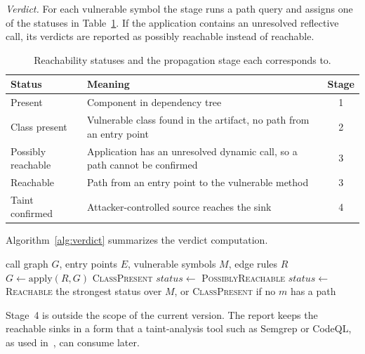 \documentclass[conference]{IEEEtran}
\begin{document}
\emph{Verdict.} For each vulnerable symbol the stage runs a path query and assigns one of the statuses in Table~\ref{tab:status}. If the application contains an unresolved reflective call, its verdicts are reported as possibly reachable instead of reachable.

\begin{table}[t]
\caption{Reachability statuses and the propagation stage each corresponds to.}
\label{tab:status}
\centering
\footnotesize
\renewcommand{\arraystretch}{1.15}
\setlength{\tabcolsep}{2.5pt}
\begin{tabular}{@{}p{0.95in}p{1.95in}c@{}}
\toprule
Status & Meaning & Stage \\
\midrule
Present & Component in dependency tree & 1 \\
Class present & Vulnerable class found in the artifact, no path from an entry point & 2 \\
Possibly reachable & Application has an unresolved dynamic call, so a path cannot be confirmed & 3 \\
Reachable & Path from an entry point to the vulnerable method & 3 \\
Taint confirmed & Attacker-controlled source reaches the sink & 4 \\
\bottomrule
\end{tabular}
\end{table}

Algorithm~\ref{alg:verdict} summarizes the verdict computation.

\begin{algorithm}[t]
\caption{Reachability verdict for one advisory}
\label{alg:verdict}
\small
\begin{algorithmic}[1]
\REQUIRE call graph $G$, entry points $E$, vulnerable symbols $M$, edge rules $R$
\STATE $G \leftarrow \mathrm{apply}(R, G)$
  \RETURN \textsc{ClassPresent}
\ENDIF
{}
      \STATE $status \leftarrow$ \textsc{PossiblyReachable}
    \ELSE
      \STATE $status \leftarrow$ \textsc{Reachable}
    \ENDIF
  \ENDIF
\ENDFOR
\RETURN the strongest status over $M$, or \textsc{ClassPresent} if no $m$ has a path
\end{algorithmic}
\end{algorithm}

Stage~4 is outside the scope of the current version. The report keeps the reachable sinks in a form that a taint-analysis tool such as Semgrep or CodeQL, as used in~\cite{grgic}, can consume later.
\end{document}

